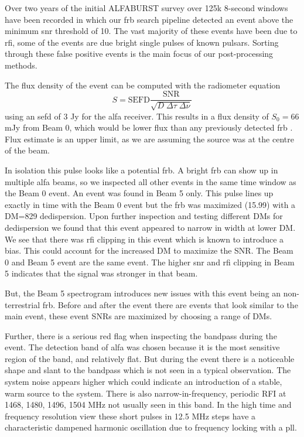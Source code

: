 \documentclass[a4paper,fleqn,usenatbib]{mnras}
\begin{document}
Over two years of the initial ALFABURST survey over 125k 8-second windows have
been recorded in which our \gls{frb} search pipeline detected an event above the
minimum \gls{snr} threshold of 10. The vast majority of these events have been
due to \gls{rfi}, some of the events are due bright single pulses of known
pulsars. Sorting through these false positive events is the main focus of our
post-processing methods.


The flux density of the event can be computed with the radiometer equation
%
$$
S = \textrm{SEFD} \frac{\textrm{SNR}}{\sqrt{D \; \Delta \tau \;
\Delta \nu}}
$$
%
using an \gls{sefd} of 3 Jy for the \gls{alfa} receiver. This results in a flux
density of $S_0 = 66$ mJy from Beam 0, which would be lower flux than any
previously detected \gls{frb} \citep{2016PASA...33...45P}. Flux estimate is an
upper limit, as we are assuming the source was at the centre of the beam.

In isolation this pulse looks like a potential \gls{frb}. A bright \gls{frb} can
show up in multiple \gls{alfa} beams, so we inspected all other events in the
same time window as the Beam 0 event. An event was found in Beam 5 only. This
pulse lines up exactly in time with the Beam 0 event but the \gls{frb} was
maximized (15.99) with a DM=829 dedispersion. Upon further inspection and
testing different DMs for dedispersion we found that this event appeared to
narrow in width at lower DM. We see that there was \gls{rfi} clipping in this
event which is known to introduce a bias. This could account for the increased
DM to maximize the SNR. The Beam 0 and Beam 5 event are the same event. The
higher \gls{snr} and \gls{rfi} clipping in Beam 5 indicates that the signal was
stronger in that beam.

But, the Beam 5 spectrogram introduces new issues with this event being an
non-terrestrial \gls{frb}. Before and after the event there are events that look
similar to the main event, these event SNRs are maximized by choosing a range of
DMs.

Further, there is a serious red flag when inspecting the bandpass during the
event. The detection band of \gls{alfa} was chosen because it is the most sensitive
region of the band, and relatively flat. But during the event there is a
noticeable shape and slant to the bandpass which is not seen in a typical
observation. The system noise appears higher which could indicate an
introduction of a stable, warm source to the system. There is also
narrow-in-frequency, periodic RFI at 1468, 1480, 1496, 1504 MHz not usually seen
in this band. In the high time and frequency resolution view these short pulses
in 12.5 MHz steps have a characteristic dampened harmonic oscillation due to
frequency locking with a \gls{pll}.
\end{document}

